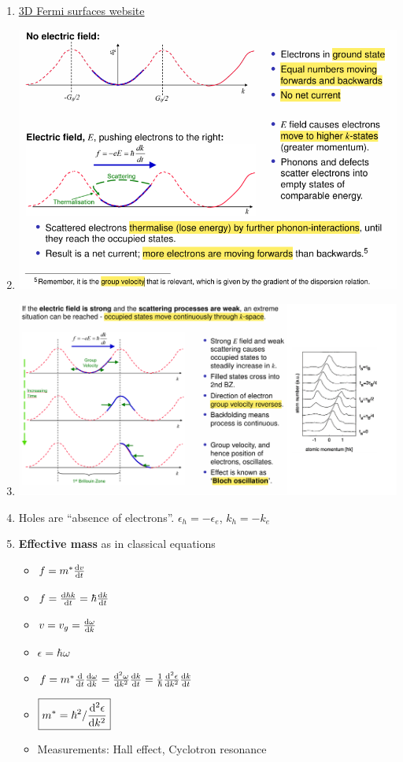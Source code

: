 \documentclass{article}
\theoremstyle{remark}
\theoremstyle{remark}
\begin{document}
\begin{enumerate}
    \item \href{https://www.phys.ufl.edu/fermisurface/}{3D Fermi surfaces website}
    \item \includegraphics*[width=0.8\linewidth]{cmp_formation_of_current.png}
    \item \includegraphics*[width=0.9\linewidth]{cmp_Bloch_oscillation.png}
    \item Holes are ``absence of electrons''. $\epsilon_h=-\epsilon_e$, $k_h=-k_e$
    \item \textbf{Effective mass} as in classical equations\begin{itemize}
            \item $f=m^*\dv{v}{t}$
            \item $f=\dv{\hbar k}{t}=\hbar\dv{k}{t}$
            \item $v=v_g=\dv{\omega}{k}$
            \item $\epsilon=\hbar\omega$
            \item $f=m^*\dv{t}\dv{\omega}{k}=\dv[2]{\omega}{k}\dv{k}{t}=\frac{1}{\hbar}\dv[2]{\epsilon}{k}\dv{k}{t}$
            \item $\boxed{m^*=\hbar^2/\dv[2]{\epsilon}{k}}$
            \item Measurements: Hall effect, Cyclotron resonance

\end{itemize}
\end{enumerate}
\end{document}
